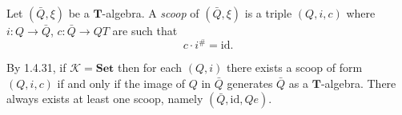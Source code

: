 Let $(\bar{Q}, \xi)$ be a $\mathbf{T}$-algebra. A \textit{scoop} of $(\bar{Q}, \xi)$ is a triple $(Q, i, c)$ where $i: Q \to \bar{Q}$, $c: \bar{Q} \to QT$ are such that
$$c \cdot i^{\#} = \mathrm{id}.$$

By 1.4.31, if $\mathcal{K} = \mathbf{Set}$ then for each $(Q, i)$ there exists a scoop of form $(Q, i, c)$ if and only if the image of $Q$ in $\bar{Q}$ generates $\bar{Q}$ as a $\mathbf{T}$-algebra. There always exists at least one scoop, namely $(\bar{Q}, \mathrm{id}, Qe)$.
